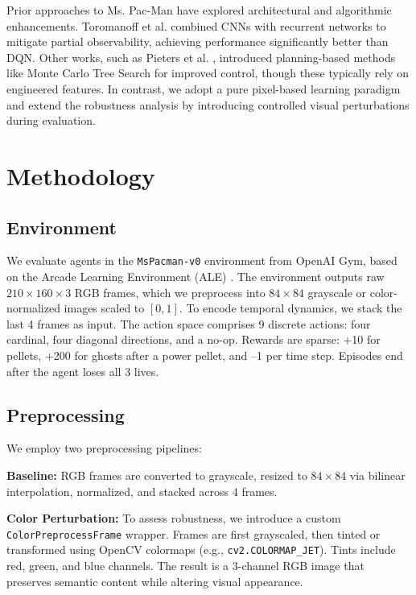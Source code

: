 \documentclass{article}
\begin{document}
Prior approaches to Ms. Pac-Man have explored architectural and algorithmic enhancements. Toromanoff et al. \cite{toromanoff2019deep} combined CNNs with recurrent networks to mitigate partial observability, achieving performance significantly better than DQN. Other works, such as Pieters et al. \cite{pieters2016monte}, introduced planning-based methods like Monte Carlo Tree Search for improved control, though these typically rely on engineered features. In contrast, we adopt a pure pixel-based learning paradigm and extend the robustness analysis by introducing controlled visual perturbations during evaluation.

\section{Methodology}

\subsection{Environment}

We evaluate agents in the \texttt{MsPacman-v0} environment from OpenAI Gym, based on the Arcade Learning Environment (ALE) \cite{ale}. The environment outputs raw $210 \times 160 \times 3$ RGB frames, which we preprocess into $84 \times 84$ grayscale or color-normalized images scaled to $[0, 1]$. To encode temporal dynamics, we stack the last 4 frames as input. The action space comprises 9 discrete actions: four cardinal, four diagonal directions, and a no-op. Rewards are sparse: +10 for pellets, +200 for ghosts after a power pellet, and –1 per time step. Episodes end after the agent loses all 3 lives.

\subsection{Preprocessing}

We employ two preprocessing pipelines:

\textbf{Baseline:} RGB frames are converted to grayscale, resized to $84 \times 84$ via bilinear interpolation, normalized, and stacked across 4 frames.

\textbf{Color Perturbation:} To assess robustness, we introduce a custom \texttt{ColorPreprocessFrame} wrapper. Frames are first grayscaled, then tinted or transformed using OpenCV colormaps (e.g., \texttt{cv2.COLORMAP\_JET}). Tints include red, green, and blue channels. The result is a 3-channel RGB image that preserves semantic content while altering visual appearance.
\end{document}
